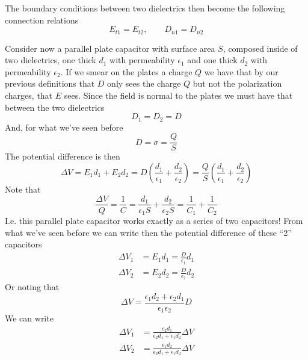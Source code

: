 \documentclass[../electromagnetism]{subfiles}
\begin{document}
The boundary conditions between two dielectrics then become the following connection relations
\begin{equation}
	E_{t1}=E_{t2},\qquad D_{n1}=D_{n2}
	\label{eq:boundconddie}
\end{equation}
\begin{eg}
	Consider now a parallel plate capacitor with surface area $S$, composed inside of two dielectrics, one thick $d_1$ with permeability $\epsilon_1$ and one thick $d_2$ with permeability $\epsilon_2$. If we smear on the plates a charge $Q$ we have that by our previous definitions that $D$ only sees the charge $Q$ but not the polarization charges, that $E$ sees. Since the field is normal to the plates we must have that between the two dielectrics
	\begin{equation*}
		D_1=D_2=D
	\end{equation*}
	And, for what we've seen before
	\begin{equation*}
		D=\sigma=\frac{Q}{S}
	\end{equation*}
	The potential difference is then
	\begin{equation*}
		\Delta V=E_1d_1+E_2d_2=D\left( \frac{d_1}{\epsilon_1}+\frac{d_2}{\epsilon_2} \right)=\frac{Q}{S}\left( \frac{d_1}{\epsilon_1}+\frac{d_2}{\epsilon_2} \right)
	\end{equation*}
	Note that
	\begin{equation*}
		\frac{\Delta V}{Q}=\frac{1}{C}=\frac{d_1}{\epsilon_1S}+\frac{d_2}{\epsilon_2S}=\frac{1}{C_1}+\frac{1}{C_2}
	\end{equation*}
	I.e. this parallel plate capacitor works exactly as a series of two capacitors!
	From what we've seen before we can write then the potential difference of these ``2'' capacitors
	\begin{equation*}
		\begin{aligned}
			\Delta V_1&=E_1d_1=\frac{D}{\epsilon_1}d_1\\
			\Delta V_2&=E_2d_2=\frac{D}{\epsilon_2}d_2
		\end{aligned}
	\end{equation*}
	Or noting that
	\begin{equation*}
		\Delta V=\frac{\epsilon_1d_2+\epsilon_2d_1}{\epsilon_1\epsilon_2}D
	\end{equation*}
	We can write
	\begin{equation*}
		\begin{aligned}
			\Delta V_1&=\frac{\epsilon_2d_1}{\epsilon_2d_1+\epsilon_1d_2}\Delta V\\
			\Delta V_2&=\frac{\epsilon_1d_2}{\epsilon_2d_1+\epsilon_1d_2}\Delta V
		\end{aligned}
	\end{equation*}
\end{eg}
\end{document}

